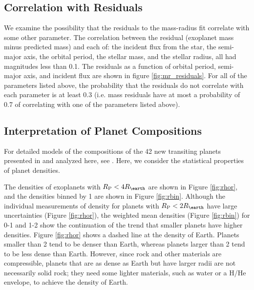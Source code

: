 \documentclass[11pt]{aastex}
\newcommand{\rspecial}{4 \rearth}
\begin{document}

\subsection{Correlation with Residuals}
We examine the possibility that the residuals to the mass-radius fit correlate with some other parameter.  The correlation between the residual (exoplanet mass minus predicted mass) and each of: the incident flux from the star, the semi-major axis, the orbital period, the stellar mass, and the stellar radius, all had magnitudes less than 0.1.  The residuals as a function of orbital period, semi-major axis, and incident flux are shown in figure \ref{fig:mr_residuals}.  For all of the parameters listed above, the probability that the residuals do not correlate with each parameter is at least $ 0.3$ (i.e. mass residuals have at most a probability of 0.7 of correlating with one of the parameters listed above).

\subsection{Interpretation of Planet Compositions}
For detailed models of the compositions of the 42 new transiting planets presented in \citet{Marcy2013} and analyzed here, see \citet{Rogers2013}.  Here, we consider the statistical properties of planet densities.

The densities of exoplanets with $\rpl < \rspecial$ are shown in Figure \ref{fig:rhor}, and the densities binned by 1 \rearth are shown in Figure \ref{fig:rbin}.  Although the individual measurements of density for planets with $\rpl < 2 \rearth$ have large uncertainties (Figure \ref{fig:rhor}), the weighted mean densities (Figure \ref{fig:rbin}) for 0-1 \rearth and 1-2 \rearth show the continuation of the trend that smaller planets have higher densities.  Figure \ref{fig:rhor} shows a dashed line at the density of Earth.  Planets smaller than 2 \rearth tend to be denser than Earth, whereas planets larger than 2 \rearth tend to be less dense than Earth.  However, since rock and other materials are compressible, planets that are as dense as Earth but have larger radii are not necessarily solid rock; they need some lighter materials, such as water or a H/He envelope, to achieve the density of Earth.
\end{document}
